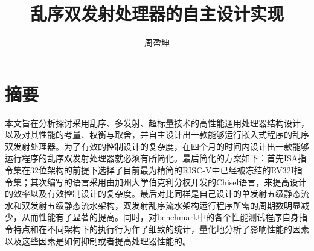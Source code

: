 \confidential{}%
\title{乱序双发射处理器的自主设计实现}%
\author{周盈坤}%
\advisorsec{}%
\maketitle%
\makeenglishtitle%
\makedeclaration%
\chapter*{摘\quad 要}%
\setcounter{page}{1}%
本文旨在分析探讨采用乱序、多发射、超标量技术的高性能通用处理器结构设计，以及对其性能的考量、权衡与取舍，并自主设计出一款能够运行嵌入式程序的乱序双发射处理器。为了有效的控制设计的复杂度，在四个月的时间内设计出一款能够运行程序的乱序双发射处理器就必须有所简化。最后简化的方案如下：首先ISA指令集在32位架构的前提下选择了目前最为精简的RISC-V中已经被冻结的RV32I指令集；其次编写的语言采用由加州大学伯克利分校开发的Chisel语言，来提高设计的效率以及有效控制设计的复杂度。最后对比同样是自己设计的单发射五级静态流水和双发射五级静态流水架构，双发射乱序流水架构运行程序所需的周期数明显减少，从而性能有了显著的提高。同时，对benchmark中的各个性能测试程序自身指令特点和在不同架构下的执行行为作了细致的统计，量化地分析了影响性能的因素以及这些因素是如何抑制或者提高处理器性能的。

